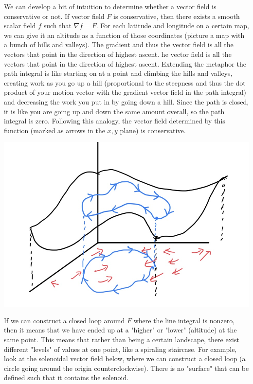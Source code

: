 \documentclass{article}
\theoremstyle{remark}
\theoremstyle{definition}
\begin{document}
We can develop a bit of intuition to determine whether a vector field is conservative or not. If vector field $F$ is conservative, then there exists a smooth scalar field $f$ such that $\nabla f = F$. For each latitude and longitude on a certain map, we can give it an altitude as a function of those coordinates (picture a map with a bunch of hills and valleys). The gradient and thus the vector field is all the vectors that point in the direction of highest ascent. he vector field is all the vectors that point in the direction of highest ascent. Extending the metaphor the path integral is like starting on at a point and climbing the hills and valleys, creating work as you go up a hill (proportional to the steepness and thus the dot product of your motion vector with the gradient vector field in the path integral) and decreasing the work you put in by going down a hill. Since the path is closed, it is like you are going up and down the same amount overall, so the path integral is zero. Following this analogy, the vector field determined by this function (marked as arrows in the $x, y$ plane) is conservative. 
\begin{center}
    \includegraphics[scale=0.28]{img/Conservative_Vector_Field.jpg}
\end{center}
If we can construct a closed loop around $F$ where the line integral is nonzero, then it means that we have ended up at a "higher" or "lower" (altitude) at the same point. This means that rather than being a certain landscape, there exist different "levels" of values at one point, like a spiraling staircase. For example, look at the solenoidal vector field below, where we can construct a closed loop (a circle going around the origin counterclockwise). There is no "surface" that can be defined such that it contains the solenoid. 
\end{document}
